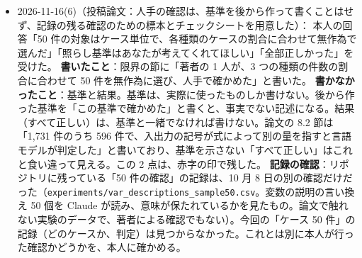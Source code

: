 \documentclass[11pt,a4paper]{jsarticle}
\begin{document}
\begin{itemize}[nosep]
    \textbf{以前の言語モデルの判定との一致}：判定を固定したあとで、C3 を以前の判定（Claude Opus 5.5、10 月 8 日）と比べた。共通の記号がある 41 件のうち、以前の判定がある 15 件はすべて「いいえ」、ない 26 件のうち 25 件は「はい」で、残る 1 件（\texttt{dae\_X3\_083}）は、変数が「a, b, c」とまとめて記録されていて共通の記号の一覧に出ない a（伝熱のパラメータと多項式の係数）を「いいえ」とした。どちらも言語モデルの判定なので、人手の確認の代わりにはならない。
    \textbf{基準の外で気づいたこと}：同じ量が別の表記で入力と出力の両方にある件が 3 件（\texttt{ms\_dual\_reaction\_001\_rv2} の $-r_A$ と $r_A$、\texttt{dae\_X2\_075} の $a(z,t)$ と $a$、\texttt{dae\_X8\_059} の $T_s$ と $T_s(t)$）。同じ量が 2 つの表記で入力にある件が 1 件（\texttt{ms\_dual\_reaction\_001\_rv3}）。説明文が文の途中で切れている件が 1 件（\texttt{dae\_X4\_008}）。出力が物理定数である件が 2 件（ファラデー定数、ウィーンの変位則の定数）。
    \textbf{注意}：これは言語モデルの判定で、人手の確認の結果ではない。論文の「人手で確かめた」の根拠にはしない。C1 と C2 は厳しく読んだので、著者の判定と食い違うときは、理由を並べて確かめる。
  \item 2026-11-16(6)（投稿論文：人手の確認は、基準を後から作って書くことはせず、記録の残る確認のための標本とチェックシートを用意した）：
    本人の回答「50 件の対象はケース単位で、各種類のケースの割合に合わせて無作為で選んだ」「照らし基準はあなたが考えてくれてほしい」「全部正しかった」を受けた。
    \textbf{書いたこと}：限界の節に「著者の 1 人が、3 つの種類の件数の割合に合わせて 50 件を無作為に選び、人手で確かめた」と書いた。
    \textbf{書かなかったこと}：基準と結果。基準は、実際に使ったものしか書けない。後から作った基準を「この基準で確かめた」と書くと、事実でない記述になる。結果（すべて正しい）は、基準と一緒でなければ書けない。論文の 8.2 節は「1,731 件のうち 596 件で、入出力の記号が式によって別の量を指すと言語モデルが判定した」と書いており、基準を示さない「すべて正しい」はこれと食い違って見える。この 2 点は、赤字の印で残した。
    \textbf{記録の確認}：リポジトリに残っている「50 件の確認」の記録は、10 月 8 日の別の確認だけだった（\texttt{experiments/var\_descriptions\_sample50.csv}。変数の説明の言い換え 50 個を Claude が読み、意味が保たれているかを見たもの。論文で触れない実験のデータで、著者による確認でもない）。今回の「ケース 50 件」の記録（どのケースか、判定）は見つからなかった。これとは別に本人が行った確認かどうかを、本人に確かめる。

\end{itemize}
\end{document}
